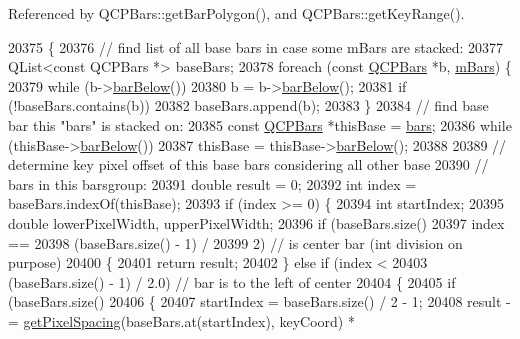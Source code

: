 Referenced by Q\+C\+P\+Bars\+::get\+Bar\+Polygon(), and Q\+C\+P\+Bars\+::get\+Key\+Range().


\begin{DoxyCode}
20375                                                                         \{
20376   \textcolor{comment}{// find list of all base bars in case some mBars are stacked:}
20377   QList<const QCPBars *> baseBars;
20378   \textcolor{keywordflow}{foreach} (\textcolor{keyword}{const} \hyperlink{class_q_c_p_bars}{QCPBars} *b, \hyperlink{class_q_c_p_bars_group_aa5affa0639c13e05bda9d23f16dd1393}{mBars}) \{
20379     \textcolor{keywordflow}{while} (b->\hyperlink{class_q_c_p_bars_a2c46a686cbad95f180ca3c2e88263961}{barBelow}())
20380       b = b->\hyperlink{class_q_c_p_bars_a2c46a686cbad95f180ca3c2e88263961}{barBelow}();
20381     \textcolor{keywordflow}{if} (!baseBars.contains(b))
20382       baseBars.append(b);
20383   \}
20384   \textcolor{comment}{// find base bar this "bars" is stacked on:}
20385   \textcolor{keyword}{const} \hyperlink{class_q_c_p_bars}{QCPBars} *thisBase = \hyperlink{class_q_c_p_bars_group_a7c72ed1f8cd962c93b8c42ab96cd91ec}{bars};
20386   \textcolor{keywordflow}{while} (thisBase->\hyperlink{class_q_c_p_bars_a2c46a686cbad95f180ca3c2e88263961}{barBelow}())
20387     thisBase = thisBase->\hyperlink{class_q_c_p_bars_a2c46a686cbad95f180ca3c2e88263961}{barBelow}();
20388 
20389   \textcolor{comment}{// determine key pixel offset of this base bars considering all other base}
20390   \textcolor{comment}{// bars in this barsgroup:}
20391   \textcolor{keywordtype}{double} result = 0;
20392   \textcolor{keywordtype}{int} index = baseBars.indexOf(thisBase);
20393   \textcolor{keywordflow}{if} (index >= 0) \{
20394     \textcolor{keywordtype}{int} startIndex;
20395     \textcolor{keywordtype}{double} lowerPixelWidth, upperPixelWidth;
20396     \textcolor{keywordflow}{if} (baseBars.size() %
20397         index ==
20398             (baseBars.size() - 1) /
20399                 2) \textcolor{comment}{// is center bar (int division on purpose)}
20400     \{
20401       \textcolor{keywordflow}{return} result;
20402     \} \textcolor{keywordflow}{else} \textcolor{keywordflow}{if} (index <
20403                (baseBars.size() - 1) / 2.0) \textcolor{comment}{// bar is to the left of center}
20404     \{
20405       \textcolor{keywordflow}{if} (baseBars.size() %
20406       \{
20407         startIndex = baseBars.size() / 2 - 1;
20408         result -= \hyperlink{class_q_c_p_bars_group_a0beccd41bc3841a4c5b284823bc7d2de}{getPixelSpacing}(baseBars.at(startIndex), keyCoord) *

\end{DoxyCode}

